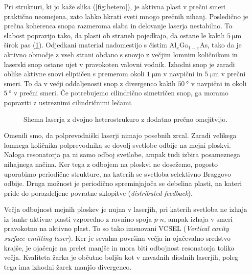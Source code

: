 Pri strukturi, ki jo kaže slika (\ref{fig:hetero}), je aktivna plast v prečni smeri praktično neomejena, 
zato lahko hkrati sveti mnogo prečnih nihanj. Posledično je prečna koherenca snopa razmeroma slaba in 
delovanje laserja nestabilno. To slabost popravijo tako, da plasti ob straneh pojedkajo, da ostane le
kakih $5~\si{\micro\meter}$ širok pas (\ref{fig:heshema}). Odjedkani material nadomestijo s čistim Al$_x$Ga$_{1-x}$As, 
tako da je aktivno območje z vseh strani obdano s snovjo z večjim lomnim količnikom in laserski
snop ostane ujet v pravokoten valovni vodnik. Izhodni snop je zaradi oblike aktivne snovi eliptičen s 
premerom okoli $1~\si{\micro\meter}$ v navpični in $5~\si{\micro\meter}$ v prečni smeri. 
To da v večji oddaljenosti snop z divergenco kakih $50~\si{\degree}$ v navpični in okoli $5~\si{\degree}$ 
v prečni smeri. Če potrebujemo cilindrično simetričen snop, ga moramo popraviti z ustreznimi 
cilindričnimi lečami.
\begin{figure}[h]
\centering
\def\svgwidth{85truemm} 

\caption{Shema laserja z dvojno heterostrukuro z dodatno prečno omejitvijo.
}
\label{fig:heshema}
\end{figure}

\begin{remark}
Omenili smo, da polprevodniški laserji nimajo posebnih zrcal. Zaradi velikega lomnega
količnika polprevodnika se dovolj svetlobe odbije na mejni ploskvi. Naloga resonatorja pa ni 
samo odboj svetlobe, ampak tudi izbira posameznega nihajnega načina. Ker tega z odbojem 
na ploskvi ne dosežemo, pogosto uporabimo periodične strukture, na katerih se svetloba selektivno
Braggovo odbije. Druga možnost je periodično spreminjajoča se debelina plasti, na kateri pride
do porazdeljene povratne sklopitve ({\it distributed feedback}). 
 
Večja odbojnost mejnih ploskev je nujna v laserjih, pri katerih svetloba ne izhaja iz
tanke aktivne plasti vzporedno z ravnino spoja $p$-$n$, ampak izhaja v smeri pravokotno na aktivno plast.
To so tako imenovani VCSEL ({\it Vertical cavity surface-emitting laser}). Ker je sevalna površina večja in 
ojačevalno sredstvo krajše, je ojačenje na prelet manjše in mora biti odbojnost resonatorja toliko večja. 
Kvaliteta žarka je občutno boljša kot v navadnih diodnih laserjih, poleg tega ima izhodni 
žarek manjšo divergenco.
\end{remark}

